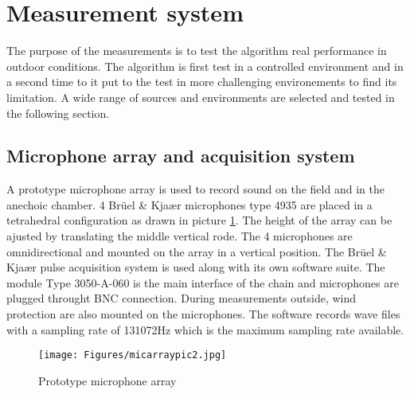 \section{Measurement system}
The purpose of the measurements is to test the algorithm real performance in outdoor conditions. The algorithm is first test in a controlled environment and in a second time to it put to the test in more challenging environements to find its limitation. A wide range of sources and environments are selected and tested in the following section.

\subsection{Microphone array and acquisition system}

A prototype microphone array is used to record sound on the field and in the anechoic chamber. 4 Brüel \& Kjaær microphones type 4935 are placed in a tetrahedral configuration as drawn in picture \ref{fig:micarraypic}. The height of the array can be ajusted by translating the middle vertical rode. The 4 microphones are omnidirectional and mounted on the array in a vertical position.
The Brüel \& Kjaær pulse acquisition system is used along with its own software suite. The module Type 3050-A-060 is the main interface of the chain and microphones are plugged throught BNC connection. During measurements outside, wind protection are also mounted on the microphones. The software records wave files with a sampling rate of 131072Hz which is the maximum sampling rate available.

\begin{figure}[H]
    \centering
    \texttt{[image: Figures/micarraypic2.jpg]}
    \caption{Prototype microphone array}
    \label{fig:micarraypic}
\end{figure}
